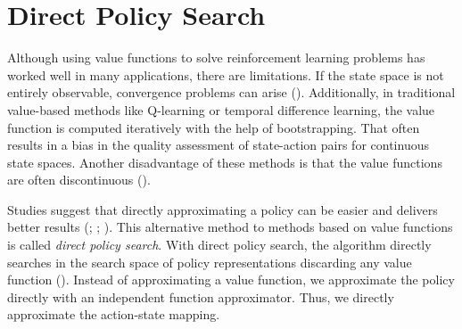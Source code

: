 \section{Direct Policy Search}
Although using value functions to solve reinforcement learning problems has worked well in many applications, there are limitations. If the state space is not entirely observable, convergence problems can arise (\cite{el2005direct}). Additionally, in traditional value-based methods like Q-learning or temporal difference learning, the value function is computed iteratively with the help of bootstrapping. That often results in a bias in the quality assessment of state-action pairs for continuous state spaces. Another disadvantage of these methods is that the value functions are often discontinuous (\cite{deisenroth2013survey}).

Studies suggest that directly approximating a policy can be easier and delivers better results (\cite{DBLP:journals/corr/abs-1806-01363}; \cite{sutton1999policy}; \cite{anderson2000approximating}). This alternative method to methods based on value functions is called \textit{direct policy search}. With direct policy search, the algorithm directly searches in the search space of policy representations discarding any value function (\cite{wierstra2010study}). Instead of approximating a value function, we approximate the policy directly with an independent function approximator. Thus, we directly approximate the action-state mapping.


